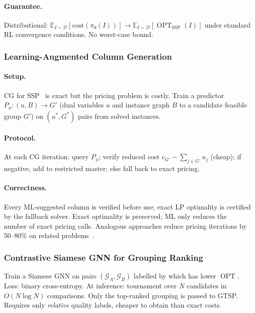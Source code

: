 \documentclass[11pt,a4paper]{article}
\theoremstyle{plain}
\theoremstyle{definition}
\DeclareMathOperator{\OPT}{OPT}
\newcommand{\calG}{\mathcal{G}}
\begin{document}
\paragraph{Guarantee.} Distributional:
$\mathbb{E}_{I\sim\mathcal{D}}[\mathrm{cost}(\pi_\theta(I))]\to
\mathbb{E}_{I\sim\mathcal{D}}[\OPT_{\mathrm{SSP}}(I)]$ under standard RL convergence
conditions. No worst-case bound.

\subsubsection{Learning-Augmented Column Generation}
\label{sec:LACG}

\paragraph{Setup.} CG for SSP~\cite{daSilva2021} is exact but the pricing problem
is costly. Train a predictor $P_\phi:(u,B)\to G'$ (dual variables $u$ and instance
graph $B$ to a candidate feasible group $G'$) on $(u^*,G^*)$ pairs from solved
instances.

\paragraph{Protocol.} At each CG iteration: query $P_\phi$; verify reduced cost
$c_{G'}-\sum_{j\in G'}u_j$ (cheap); if negative, add to restricted master;
else fall back to exact pricing.

\paragraph{Correctness.} Every ML-suggested column is verified before use;
exact LP optimality is certified by the fallback solver. Exact optimality is preserved;
ML only reduces the number of exact pricing calls. Analogous
approaches reduce pricing iterations by 50--80\% on related problems~\cite{Gasse2019}.

\subsubsection{Contrastive Siamese GNN for Grouping Ranking}
\label{sec:contrastive}

Train a Siamese GNN on pairs $(\calG_A,\calG_B)$ labelled by which has lower
$\OPT$. Loss: binary cross-entropy. At inference: tournament over $N$ candidates
in $O(N\log N)$ comparisons. Only the top-ranked grouping is passed to GTSP.
Requires only \emph{relative} quality labels, cheaper to obtain than exact costs.
\end{document}
